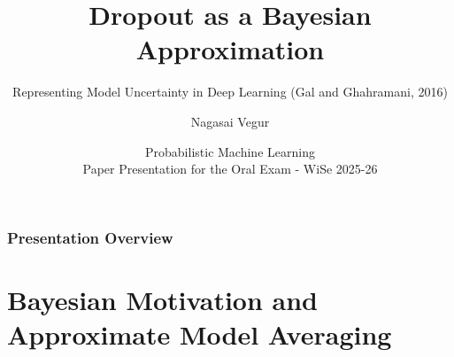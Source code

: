 \documentclass[
	11pt, %
]{beamer}
\title[Dropout as Bayesian Approximation]{Dropout as a Bayesian Approximation} %
\subtitle{\tiny{Representing Model Uncertainty in Deep Learning (Gal and Ghahramani, 2016)}} %
\author[NSVegur]{Nagasai Vegur} %
\institute[TUHH]{Technische Universität Hamburg \\ \smallskip \tiny{nagasai.vegur@tuhh.de}} %
\date[\today]{Probabilistic Machine Learning \\ \tiny{Paper Presentation for the Oral Exam - WiSe 2025-26}} %
\begin{document}

\begin{frame}
	\titlepage %
\end{frame}



\begin{frame}
	\frametitle{Presentation Overview} %
	
	\tableofcontents %
\end{frame}



\section{Bayesian Motivation and Approximate Model Averaging} %
\end{document}
